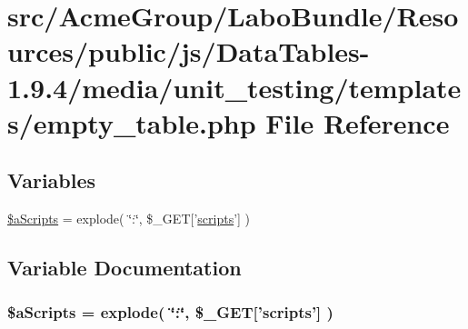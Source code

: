 \hypertarget{empty__table_8php}{\section{src/\+Acme\+Group/\+Labo\+Bundle/\+Resources/public/js/\+Data\+Tables-\/1.9.4/media/unit\+\_\+testing/templates/empty\+\_\+table.php File Reference}
\label{empty__table_8php}
}
\subsection*{Variables}
\begin{DoxyCompactItemize}
\item 
\hyperlink{empty__table_8php_a3e8e1608000c9afdd05327fc2b06b056}{\$a\+Scripts} = explode( \char`\"{}\+:\char`\"{}, \$\+\_\+\+G\+E\+T\mbox{[}'\hyperlink{tinymce_8jquery_8dev_8js_a09066d4d580eeec222f858d588b4cdef}{scripts}'\mbox{]} )
\end{DoxyCompactItemize}


\subsection{Variable Documentation}
\hypertarget{empty__table_8php_a3e8e1608000c9afdd05327fc2b06b056}{
\subsubsection[{\$a\+Scripts}]{\setlength{\rightskip}{0pt plus 5cm}\$a\+Scripts = explode( \char`\"{}\+:\char`\"{}, \$\+\_\+\+G\+E\+T\mbox{[}'{\bf scripts}'\mbox{]} )}}\label{empty__table_8php_a3e8e1608000c9afdd05327fc2b06b056}

